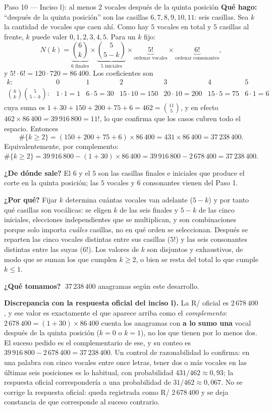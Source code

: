 \documentclass[11pt]{article}
\begin{document}
\begin{paso}{Paso 10 --- Inciso l): al menos 2 vocales después de la quinta posición}
\textbf{Qué hago:} ``después de la quinta posición'' son las casillas $6,7,8,9,10,11$: seis casillas. Sea
$k$ la cantidad de vocales que caen ahí. Como hay $5$ vocales en total y $5$ casillas al frente,
$k$ puede valer $0,1,2,3,4,5$. Para un $k$ fijo:
\[
N(k)=\underbrace{\binom{6}{k}}_{\text{6 finales}}\times
\underbrace{\binom{5}{5-k}}_{\text{5 iniciales}}\times
\underbrace{5!}_{\text{ordenar vocales}}\times\underbrace{6!}_{\text{ordenar consonantes}} ,
\]
y $5!\cdot6!=120\cdot720=86\,400$. Los coeficientes son
\[
\begin{array}{lllllll}
k: & 0 & 1 & 2 & 3 & 4 & 5\\
\binom{6}{k}\binom{5}{5-k}: & 1\cdot1=1 & 6\cdot5=30 & 15\cdot10=150 & 20\cdot10=200 & 15\cdot5=75 & 6\cdot1=6
\end{array}
\]
cuya suma es $1+30+150+200+75+6=462=\binom{11}{5}$, y en efecto
$462\times86\,400=39\,916\,800=11!$, lo que confirma que los casos cubren todo el espacio.
Entonces
\[
\#\{k\geq2\}=(150+200+75+6)\times86\,400=431\times86\,400=37\,238\,400 .
\]
Equivalentemente, por complemento:
$\#\{k\geq2\}=39\,916\,800-(1+30)\times86\,400=39\,916\,800-2\,678\,400=37\,238\,400$.

\textbf{¿De dónde sale?} El $6$ y el $5$ son las casillas finales e iniciales que produce el corte en la
quinta posición; las $5$ vocales y $6$ consonantes vienen del Paso 1.

\textbf{¿Por qué?} Fijar $k$ determina cuántas vocales van adelante ($5-k$) y por tanto qué casillas son
vocálicas: se eligen $k$ de las seis finales y $5-k$ de las cinco iniciales, elecciones independientes que
se multiplican, y son combinaciones porque solo importa \emph{cuáles} casillas, no en qué orden se
seleccionan. Después se reparten las cinco vocales distintas entre sus casillas ($5!$) y las seis
consonantes distintas entre las suyas ($6!$). Los valores de $k$ son disjuntos y exhaustivos, de modo que
se suman los que cumplen $k\geq2$, o bien se resta del total lo que cumple $k\leq1$.

\textbf{¿Qué tomamos?} $\;37\,238\,400$ anagramas según este desarrollo.
\end{paso}

\begin{nota}
\textbf{Discrepancia con la respuesta oficial del inciso l).} La R/ oficial es $2\,678\,400$, y ese valor
es exactamente el que aparece arriba como el \emph{complemento}: $2\,678\,400=(1+30)\times86\,400$ cuenta
los anagramas con \textbf{a lo sumo una} vocal después de la quinta posición ($k=0$ o $k=1$), no los que
tienen por lo menos dos. El suceso pedido es el complementario de ese, y su conteo es
$39\,916\,800-2\,678\,400=37\,238\,400$. Un control de razonabilidad lo confirma: en una palabra con cinco
vocales entre once letras, tener dos o más vocales en las últimas seis posiciones es lo habitual, con
probabilidad $431/462\approx0{,}93$; la respuesta oficial correspondería a una probabilidad de
$31/462\approx0{,}067$. No se corrige la respuesta oficial: queda registrada como R/ $2\,678\,400$ y se
deja constancia de que corresponde al suceso contrario.
\end{nota}
\end{document}
